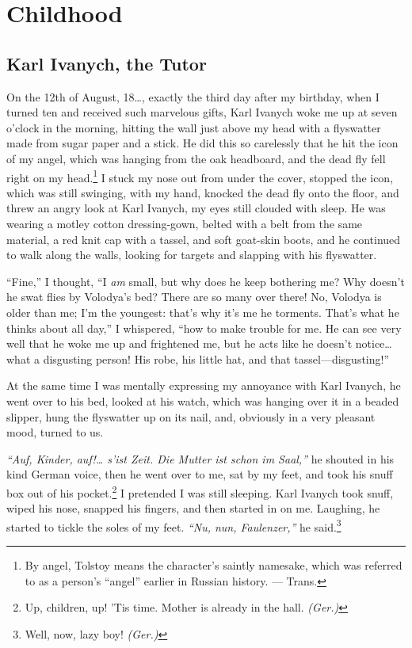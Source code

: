 \part*{Childhood}

\chapter{Karl Ivanych, the Tutor}

On the 12th of August, 18\ldots{}, exactly the third day after my birthday, when I turned ten and received such marvelous gifts, Karl Ivanych woke me up at seven o'clock in the morning, hitting the wall just above my head with a flyswatter made from sugar paper and a stick. He did this so carelessly that he hit the icon of my angel, which was hanging from the oak headboard, and the dead fly fell right on my head.\footnote{By angel, Tolstoy means the character's saintly namesake, which was referred to as a person's ``angel'' earlier in Russian history. --- Trans.} I stuck my nose out from under the cover, stopped the icon, which was still swinging, with my hand, knocked the dead fly onto the floor, and threw an angry look at Karl Ivanych, my eyes still clouded with sleep. He was wearing a motley cotton dressing-gown, belted with a belt from the same material, a red knit cap with a tassel, and soft goat-skin  boots, and he continued to walk along the walls, looking for targets and slapping with his flyswatter.

``Fine,'' I thought, ``I \emph{am} small, but why does he keep bothering me? Why doesn't he swat flies by Volodya's bed? There are so many over there! No, Volodya is older than me; I'm the youngest: that's why it's me he torments. That's what he thinks about all day,'' I whispered, ``how to make trouble for me. He can see very well that he woke me up and frightened me, but he acts like he doesn't notice\ldots{} what a disgusting person! His robe, his little hat, and that tassel---disgusting!'' %

At the same time I was mentally expressing my annoyance with Karl Ivanych, he went over to his bed, looked at his watch, which was hanging over it in a beaded slipper, hung the flyswatter up on its nail, and, obviously in a very pleasant mood, turned to us.

\textit{``Auf, Kinder, auf!\ldots{} s'ist Zeit. Die Mutter ist schon im Saal,''} he shouted in his kind German voice, then he went over to me, sat by my feet, and took his snuff box out of his pocket.\footnote{Up, children, up! 'Tis time. Mother is already in the hall. \textit{(Ger.)}} I pretended I was still sleeping. Karl Ivanych took snuff, wiped his nose, snapped his fingers, and then started in on me. Laughing, he started to tickle the soles of my feet. \textit{``Nu, nun, Faulenzer,''} he said.\footnote{Well, now, lazy boy! \textit{(Ger.)}} %

